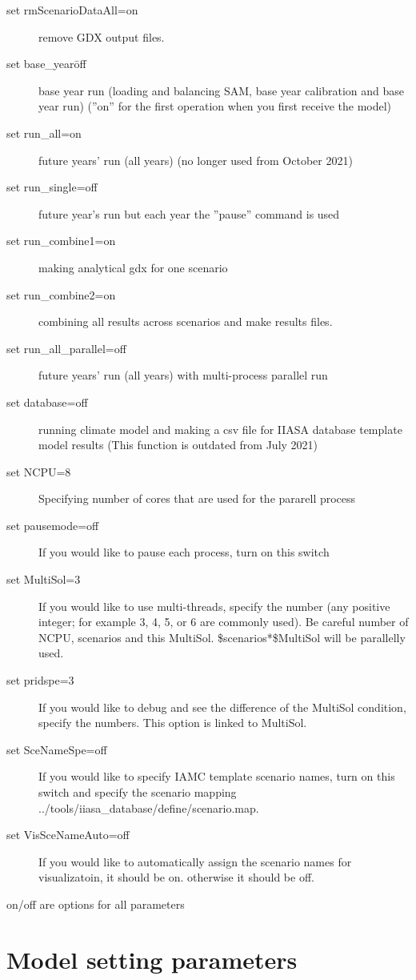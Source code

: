 \documentclass[10pt,a4paper,titlepage,dvipdfmx]{book}
\begin{document}
\begin{description}
\item[set rmScenarioDataAll=on] remove GDX output files.
\item[set base\_year\=off] base year run (loading and balancing SAM, base year calibration and base year run) (''on'' for the first operation when you first receive the model)
\item[set run\_all=on]future years' run (all years) (no longer used from October 2021)
\item[set run\_single=off]future year's run but each year the ''pause'' command is used
\item[set run\_combine1=on]making analytical gdx for one scenario
\item[set run\_combine2=on]combining all results across scenarios and make results files.
\item[set run\_all\_parallel=off]future years' run (all years) with multi-process parallel run
\item[set database=off]running climate model and making a csv file for IIASA database template model results (This function is outdated from July 2021)
\item[set NCPU=8]Specifying number of cores that are used for the pararell process
\item[set pausemode=off]If you would like to pause each process, turn on this switch
\item[set MultiSol=3]If you would like to use multi-threads, specify the number (any positive integer; for example 3, 4, 5, or 6 are commonly used). Be careful number of NCPU, scenarios and this MultiSol. \$scenarios*\$MultiSol will be parallelly used. 
\item[set pridspe=3]If you would like to debug and see the difference of the MultiSol condition, specify the numbers. This option is linked to MultiSol. 
\item[set SceNameSpe=off]If you would like to specify IAMC template scenario names, turn on this switch and specify the scenario mapping ../tools/iiasa\_database/define/scenario.map. 
\item[set VisSceNameAuto=off]If you would like to automatically assign the scenario names for visualizatoin, it should be on. otherwise it should be off.

\end{description}
on/off are options for all parameters

\section{\label{sec:ModSetPar}Model setting parameters}
\end{document}
